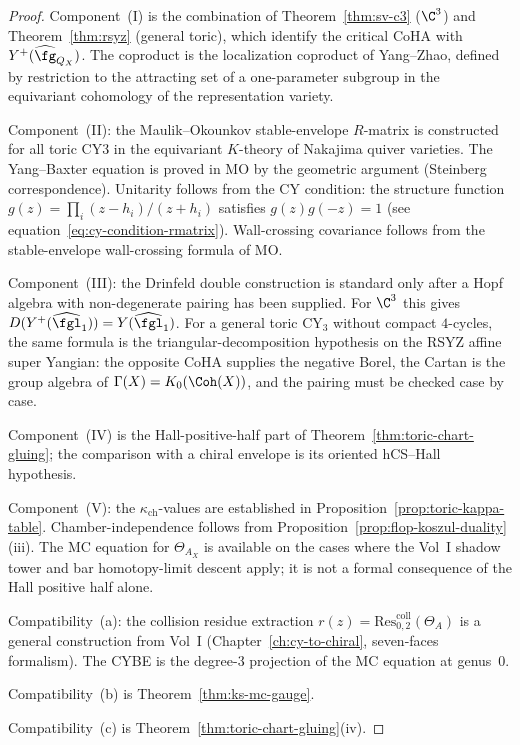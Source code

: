 \begin{proof}
Component~(I) is the combination of
Theorem~\ref{thm:sv-c3} ($\C^3$) and
Theorem~\ref{thm:rsyz} (general toric), which identify the
critical CoHA with $Y^+(\widehat{\fg}_{Q_X})$. The coproduct
is the localization coproduct of Yang--Zhao, defined by
restriction to the attracting set of a one-parameter subgroup
in the equivariant cohomology of the representation variety.

Component~(II): the Maulik--Okounkov stable-envelope $R$-matrix
is constructed for all toric CY3 in the equivariant $K$-theory of
Nakajima quiver varieties. The Yang--Baxter equation is proved
in MO by the geometric argument (Steinberg correspondence).
Unitarity follows from the CY condition: the structure function
$g(z) = \prod_i (z - h_i) / (z + h_i)$ satisfies
$g(z)g(-z) = 1$ (see equation~\eqref{eq:cy-condition-rmatrix}).
Wall-crossing covariance follows from the
stable-envelope wall-crossing formula of MO.

Component~(III): the Drinfeld double construction is standard only
after a Hopf algebra with non-degenerate pairing has been supplied.
For $\C^3$ this gives $D(Y^+(\widehat{\fgl}_1)) =
Y(\widehat{\fgl}_1)$. For a general toric CY$_3$ without compact
$4$-cycles, the same formula is the triangular-decomposition
hypothesis on the RSYZ affine super Yangian: the opposite CoHA supplies
the negative Borel, the Cartan is the group algebra of
$\Gamma(X)=K_0(\Coh(X))$, and the pairing must be checked case by
case.

Component~(IV) is the Hall-positive-half part of
Theorem~\ref{thm:toric-chart-gluing}; the comparison with a chiral
envelope is its oriented hCS--Hall hypothesis.

Component~(V): the $\kappa_{\mathrm{ch}}$-values are
established in Proposition~\ref{prop:toric-kappa-table}.
Chamber-independence follows from
Proposition~\ref{prop:flop-koszul-duality}(iii).
The MC equation for $\Theta_{A_X}$ is available on the cases where the
Vol~I shadow tower and bar homotopy-limit descent apply; it is not a
formal consequence of the Hall positive half alone.

Compatibility~(a): the collision residue extraction
$r(z) = \mathrm{Res}^{\mathrm{coll}}_{0,2}(\Theta_A)$
is a general construction from Vol~I (Chapter~\ref{ch:cy-to-chiral},
seven-faces formalism). The CYBE is the degree-$3$
projection of the MC equation at genus~$0$.

Compatibility~(b) is Theorem~\ref{thm:ks-mc-gauge}.

Compatibility~(c) is Theorem~\ref{thm:toric-chart-gluing}(iv).
\end{proof}


